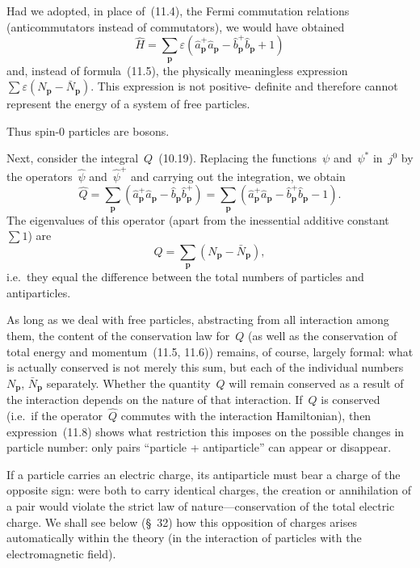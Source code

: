 Had we adopted, in place of~(11.4), the Fermi commutation relations (anticommutators instead of commutators), we would have obtained
\[
\hat{H} = \sum_\mathbf{p} \varepsilon(\hat{a}^+_\mathbf{p}\hat{a}_\mathbf{p} - \hat{b}^+_\mathbf{p}\hat{b}_\mathbf{p} + 1)
\]
and, instead of formula~(11.5), the physically meaningless expression~$\sum\varepsilon(N_\mathbf{p} - \bar{N}_\mathbf{p})$. This expression is not positive-
definite and therefore cannot represent the energy of a system of free particles.

Thus spin-0 particles are bosons.

Next, consider the integral~$Q$~(10.19). Replacing the functions~$\psi$ and~$\psi^*$ in~$j^0$ by the operators~$\hat{\psi}$ and~$\hat{\psi}^+$ and carrying out the integration, we obtain
\begin{equation}
\hat{Q} = \sum_\mathbf{p}(\hat{a}^+_\mathbf{p}\hat{a}_\mathbf{p} - \hat{b}_\mathbf{p}\hat{b}^+_\mathbf{p}) = \sum_\mathbf{p}(\hat{a}^+_\mathbf{p}\hat{a}_\mathbf{p} - \hat{b}^+_\mathbf{p}\hat{b}_\mathbf{p} - 1).
\tag{11.7}
\end{equation}
The eigenvalues of this operator (apart from the inessential additive constant~$\sum 1$) are
\begin{equation}
Q = \sum_\mathbf{p}(N_\mathbf{p} - \bar{N}_\mathbf{p}),
\tag{11.8}
\end{equation}
i.e.\ they equal the difference between the total numbers of particles and antiparticles.

As long as we deal with free particles, abstracting from all interaction among them, the content of the conservation law for~$Q$ (as well as the conservation of total energy and momentum~(11.5, 11.6)) remains, of course, largely formal: what is actually conserved is not merely this sum, but each of the individual numbers~$N_\mathbf{p}$, $\bar{N}_\mathbf{p}$ separately. Whether the quantity~$Q$ will remain conserved as a result of the interaction depends on the nature of that interaction. If~$Q$ is conserved (i.e.\ if the operator~$\hat{Q}$ commutes with the interaction Hamiltonian), then expression~(11.8) shows what restriction this imposes on the possible changes in particle number: only pairs ``particle + antiparticle'' can appear or disappear.

If a particle carries an electric charge, its antiparticle must bear a charge of the opposite sign: were both to carry identical charges, the creation or annihilation of a pair would violate the strict law of nature---conservation of the total electric charge. We shall see below (\S~32) how this opposition of charges arises automatically within the theory (in the interaction of particles with the electromagnetic field).

